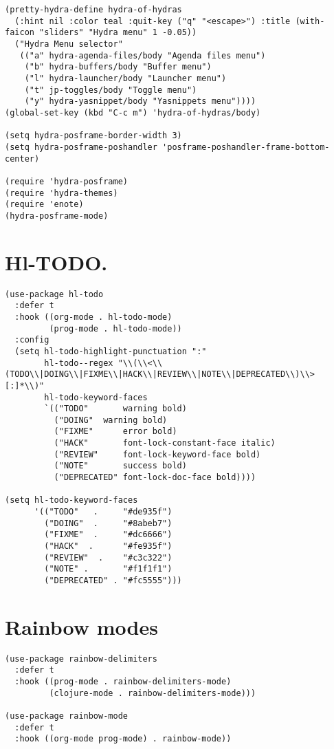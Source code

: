 \documentclass[11pt]{article}
\begin{document}
\begin{verbatim}
(pretty-hydra-define hydra-of-hydras 
  (:hint nil :color teal :quit-key ("q" "<escape>") :title (with-faicon "sliders" "Hydra menu" 1 -0.05))
  ("Hydra Menu selector"
   (("a" hydra-agenda-files/body "Agenda files menu")
    ("b" hydra-buffers/body "Buffer menu")
    ("l" hydra-launcher/body "Launcher menu")
    ("t" jp-toggles/body "Toggle menu")
    ("y" hydra-yasnippet/body "Yasnippets menu"))))
(global-set-key (kbd "C-c m") 'hydra-of-hydras/body)

(setq hydra-posframe-border-width 3)
(setq hydra-posframe-poshandler 'posframe-poshandler-frame-bottom-center)

(require 'hydra-posframe)
(require 'hydra-themes)
(require 'enote)
(hydra-posframe-mode)
\end{verbatim}
\section{Hl-TODO.}
\label{sec:org696082a}
\begin{verbatim}
(use-package hl-todo
  :defer t
  :hook ((org-mode . hl-todo-mode)
         (prog-mode . hl-todo-mode))
  :config
  (setq hl-todo-highlight-punctuation ":"
        hl-todo--regex "\\(\\<\\(TODO\\|DOING\\|FIXME\\|HACK\\|REVIEW\\|NOTE\\|DEPRECATED\\)\\>[:]*\\)"
        hl-todo-keyword-faces
        `(("TODO"       warning bold)
          ("DOING"	warning bold)
          ("FIXME"      error bold)
          ("HACK"       font-lock-constant-face italic)
          ("REVIEW"     font-lock-keyword-face bold)
          ("NOTE"       success bold)
          ("DEPRECATED" font-lock-doc-face bold))))

(setq hl-todo-keyword-faces
      '(("TODO"   .		"#de935f")
        ("DOING"  .		"#8abeb7")
        ("FIXME"  . 	"#dc6666")
        ("HACK"  . 		"#fe935f")
        ("REVIEW"  . 	"#c3c322")
        ("NOTE" . 		"#f1f1f1")
        ("DEPRECATED" . "#fc5555")))

\end{verbatim}
\section{Rainbow modes}
\label{sec:orgc90e856}
\begin{verbatim}
(use-package rainbow-delimiters
  :defer t
  :hook ((prog-mode . rainbow-delimiters-mode)
         (clojure-mode . rainbow-delimiters-mode)))

(use-package rainbow-mode
  :defer t
  :hook ((org-mode prog-mode) . rainbow-mode))
\end{verbatim}
\end{document}
